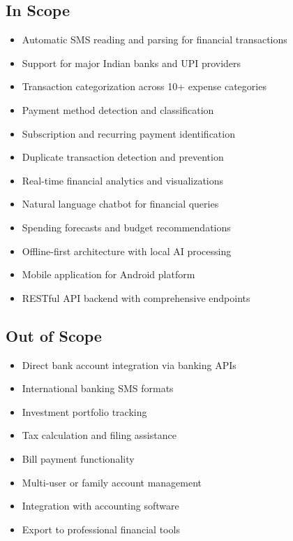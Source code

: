 \documentclass[11pt,a4paper]{report}
\begin{document}
\subsection{In Scope}

\begin{itemize}
    \item Automatic SMS reading and parsing for financial transactions
    \item Support for major Indian banks and UPI providers
    \item Transaction categorization across 10+ expense categories
    \item Payment method detection and classification
    \item Subscription and recurring payment identification
    \item Duplicate transaction detection and prevention
    \item Real-time financial analytics and visualizations
    \item Natural language chatbot for financial queries
    \item Spending forecasts and budget recommendations
    \item Offline-first architecture with local AI processing
    \item Mobile application for Android platform
    \item RESTful API backend with comprehensive endpoints
\end{itemize}

\subsection{Out of Scope}

\begin{itemize}
    \item Direct bank account integration via banking APIs
    \item International banking SMS formats
    \item Investment portfolio tracking
    \item Tax calculation and filing assistance
    \item Bill payment functionality
    \item Multi-user or family account management
    \item Integration with accounting software
    \item Export to professional financial tools
\end{itemize}
\end{document}
